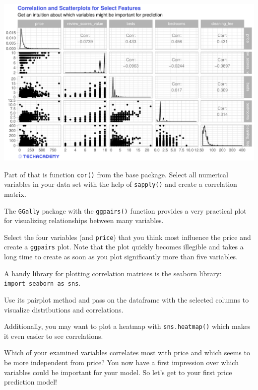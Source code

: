 \documentclass[
  11pt,
]{article}
\newenvironment{tips}[1]
  {
  \begin{itemize}
  \footnotesize
  \renewcommand{\labelitemi}{
    \raisebox{-.7\height}[0pt][0pt]{
      {\setkeys{Gin}{width=3em,keepaspectratio}
        \texttt{[image: images/\#1.png]}}
    }
  }
  \setlength{\fboxsep}{1em}
  \begin{rbox}
  \item
  }
  {
  \end{rbox}
  \end{itemize}
  }
\newenvironment{tipsp}[1]
  {
  \begin{itemize}
  \footnotesize
  \renewcommand{\labelitemi}{
    \raisebox{-.7\height}[0pt][0pt]{
      {\setkeys{Gin}{width=3em,keepaspectratio}
        \texttt{[image: images/\#1.png]}}
    }
  }
  \setlength{\fboxsep}{1em}
  \begin{pbox}
  \item
  }
  {
  \end{pbox}
  \end{itemize}
  }
\begin{document}
\begin{center}\includegraphics[width=1\linewidth]{plot/5_1_ggpairs} \end{center}

\begin{tips}r
Part of that is function \texttt{cor()} from the base package. Select all numerical variables in your data set with the help of \texttt{sapply()} and create a correlation matrix.

The \texttt{GGally} package with the \texttt{ggpairs()} function provides a very practical plot for visualizing relationships between many variables.

Select the four variables (and \texttt{price}) that you think most influence the price and create a \texttt{ggpairs} plot. Note that the plot quickly becomes illegible and takes a long time to create as soon as you plot significantly more than five variables.

\end{tips}

\begin{tipsp}p
A handy library for plotting correlation matrices is the seaborn library: \texttt{import\ seaborn\ as\ sns}.

Use its pairplot method and pass on the dataframe with the selected columns to visualize distributions and correlations.

Additionally, you may want to plot a heatmap with \texttt{sns.heatmap()} which makes it even easier to see correlations.

\end{tipsp}

Which of your examined variables correlates most with price and which seems to be more independent from price? You now have a first impression over which variables could be important for your model. So let's get to your first price prediction model!
\end{document}

